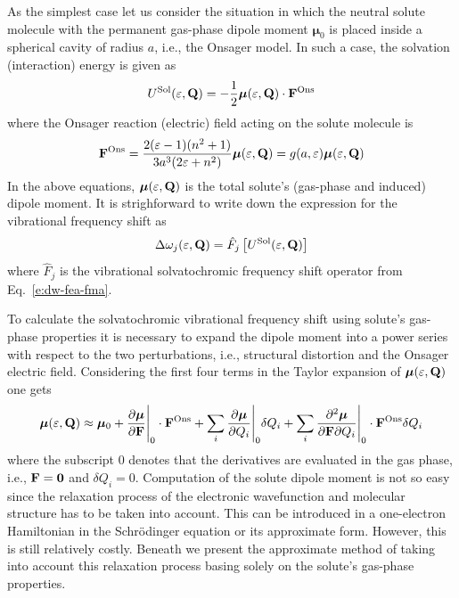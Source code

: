 \documentclass[a4paper,titlepage,twoside,fleqn,12pt]{book}
\newcommand{\BM}[1]{\bm{#1}}
\newcommand{\fderiv}[2]{\ensuremath{
\frac{\partial #1}{\partial #2}}}
\newcommand{\sderivd}[3]{\ensuremath{
\frac{\partial^2 #1}{\partial #2 \partial #3}
}}
\begin{document}
\begin{refsection}
As the simplest case let us consider the situation
in which the neutral solute molecule with the permanent gas\hyp{}phase 
dipole moment ${\BM \mu}_0$
is placed inside a spherical cavity of radius $a$, i.e., the 
Onsager model. 
In such a case, the solvation (interaction) energy is given as
%
\begin{equation} \label{e:esol-onsager}
 U^{\rm Sol}(\varepsilon, {\bf Q}) =
 -\frac{1}{2} {\BM \mu}(\varepsilon, {\bf Q}) \cdot {\bf F}^{\rm Ons}
\end{equation}
%
where the Onsager reaction (electric) field acting on the solute molecule
is
%
\begin{equation} \label{e:fons}
  {\bf F}^{\rm Ons} = \frac{2(\varepsilon-1)(n^2+1)}{3a^3(2\varepsilon+n^2)} {\BM \mu}(\varepsilon, {\bf Q})
 = g(a,\varepsilon) {\BM \mu}(\varepsilon, {\bf Q})
\end{equation}
%
In the above equations, ${\BM \mu}(\varepsilon, {\bf Q})$ 
is the total solute's (gas\hyp{}phase and induced) dipole moment.
It is strighforward to write down the expression for the
vibrational frequency shift as
%
\begin{equation} \label{e:dw-ons-gen}
  \Delta\omega_j(\varepsilon, {\bf Q}) = \hat{F}_j \left[ U^{\rm Sol}(\varepsilon, {\bf Q}) \right]
\end{equation}
%
where $\hat{F}_j$ is the vibrational solvatochromic frequency shift 
operator from Eq.~\eqref{e:dw-fea-fma}.

To calculate the solvatochromic vibrational frequency shift
using solute's gas\hyp{}phase properties it is necessary to expand
the dipole moment into a power series with respect to the two perturbations,
i.e., structural distortion and the Onsager electric field. Considering the first
four terms in the Taylor expansion of ${\BM \mu}(\varepsilon, {\bf Q})$ one gets
%
\begin{equation} \label{e:mu-qf}
 {\BM \mu}(\varepsilon, {\bf Q}) \approx 
 {\BM \mu}_0 + \fderiv{{\BM \mu}}{\bf F}\Bigg|_{0}  \cdot {\bf F}^{\rm Ons}
 + \sum_i \fderiv{{\BM \mu}}{Q_i}\Bigg|_{0} \delta Q_i 
 + \sum_i \sderivd{{\BM \mu}}{{\bf F}}{Q_i}\Bigg|_{0} \cdot {\bf F}^{\rm Ons} \delta Q_i
\end{equation}
%
where the subscript $0$ denotes that the derivatives are evaluated in the gas phase,
i.e., ${\bf F}={\bf 0}$ and $\delta Q_i=0$. Computation of the solute dipole
moment is not so easy since the relaxation process of the electronic wavefunction
and molecular structure has to be taken into account. This can 
be introduced in a one\hyp{}electron Hamiltonian in the Schr{\"o}dinger equation
or its approximate form. However, this is still relatively costly. Beneath
we present the approximate method of taking into account
this relaxation process basing solely on the solute's gas\hyp{}phase properties.


\end{refsection}
\end{document}
